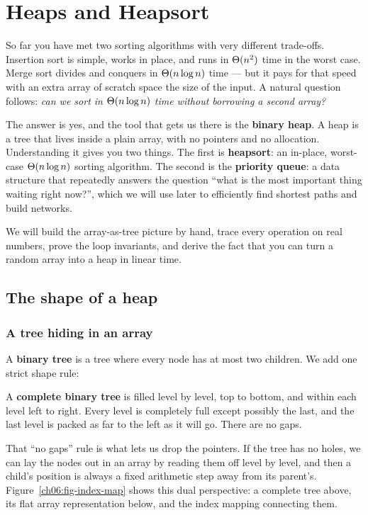 \chapter{Heaps and Heapsort}

So far you have met two sorting algorithms with very different trade-offs.
Insertion sort is simple, works in place, and runs in $\Theta(n^2)$ time in the worst
case. Merge sort divides and conquers in $\Theta(n\log n)$
time --- but it pays for that speed with an extra array of scratch space the
size of the input. A natural question follows: \emph{can we sort in
$\Theta(n\log n)$ time without borrowing a second array?}

The answer is yes, and the tool that gets us there is the \textbf{binary heap}.
A heap is a tree that lives inside a plain array, with no pointers and no
allocation. Understanding it gives you two things. The first is
\textbf{heapsort}: an in-place, worst-case $\Theta(n\log n)$ sorting algorithm. The
second is the \textbf{priority queue}: a data structure that repeatedly answers
the question ``what is the most important thing waiting right now?'', which we
will use later to efficiently find shortest paths and build networks.

We will build the array-as-tree picture by
hand, trace every operation on real numbers, prove the loop invariants, and
derive the fact that you can turn a random
array into a heap in linear time.

\section{The shape of a heap}

\subsection{A tree hiding in an array}

A \textbf{binary tree} is a tree where every node has at most two children. We add one strict shape rule:

\begin{focusbox}
A \textbf{complete binary tree} is filled level by level, top to bottom, and
within each level left to right. Every level is completely full except possibly
the last, and the last level is packed as far to the left as it will go. There
are no gaps.
\end{focusbox}

That ``no gaps'' rule is what lets us drop the pointers. If the tree has no
holes, we can lay the nodes out in an array by reading them off level by
level, and then a child's position is always a fixed arithmetic step away from
its parent's. Figure~\ref{ch06:fig-index-map} shows this dual perspective: a complete
tree above, its flat array representation below, and the index mapping connecting them.

